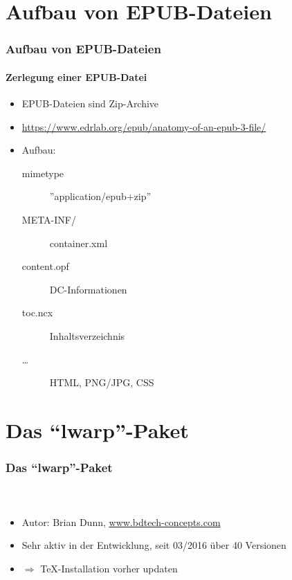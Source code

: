 \documentclass[12pt,ngerman]{beamer}
\begin{document}
\section{Aufbau von EPUB-Dateien}

\begin{frame}
\frametitle{Aufbau von EPUB-Dateien}
\framesubtitle{Zerlegung einer EPUB-Datei}

\begin{itemize}
\item EPUB-Dateien sind Zip-Archive
\item \url{https://www.edrlab.org/epub/anatomy-of-an-epub-3-file/}
\item Aufbau:

\begin{description}
\item [mimetype] ''application/epub+zip''
\item [META-INF/] container.xml
\item [content.opf] DC-Informationen
\item [toc.ncx] Inhaltsverzeichnis
\item [\ldots] HTML, PNG/JPG, CSS 
\end{description}
\end{itemize}

\end{frame}

\section{Das \enquote{lwarp}-Paket}

\begin{frame}
\frametitle{Das \enquote{lwarp}-Paket}
\framesubtitle{~}

\begin{itemize}
\item Autor: Brian Dunn, \url{www.bdtech-concepts.com}
\item Sehr aktiv in der Entwicklung, seit 03/2016 über 40 Versionen
\item $\Rightarrow$ \TeX-Installation vorher updaten
\end{itemize}

\end{frame}
\end{document}
